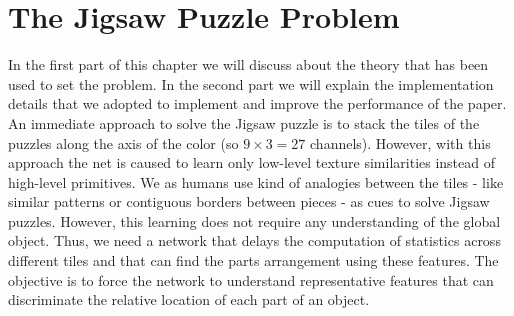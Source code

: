 \section{The Jigsaw Puzzle Problem}
In the first part of this chapter we will discuss about the theory that has been used to set the problem. In the second part we will explain the implementation details that we adopted to implement and improve the performance of the paper.\newline
An immediate approach to solve the Jigsaw puzzle is to stack the tiles of the puzzles along the axis of the color (so \(9\times3=27\) channels). However, with this approach the net is caused to learn only low-level texture similarities instead of high-level primitives. We as humans use kind of analogies between the tiles - like similar patterns or contiguous borders between pieces - as cues to solve Jigsaw puzzles. However, this learning does not require any understanding of the global object. Thus, we need a network that delays the computation of statistics across different tiles and that can find the parts arrangement using these features. The objective is to force the network to understand representative features that can discriminate the relative location of each part of an object.


